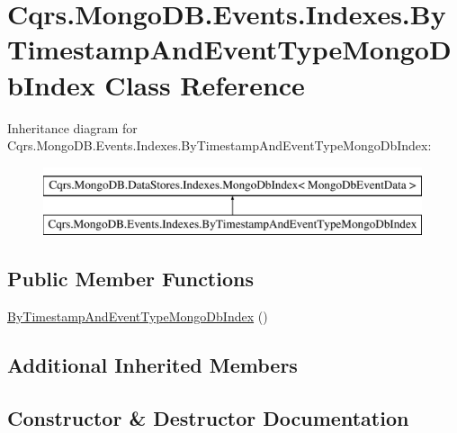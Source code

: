 \hypertarget{classCqrs_1_1MongoDB_1_1Events_1_1Indexes_1_1ByTimestampAndEventTypeMongoDbIndex}{}\section{Cqrs.\+Mongo\+D\+B.\+Events.\+Indexes.\+By\+Timestamp\+And\+Event\+Type\+Mongo\+Db\+Index Class Reference}
\label{classCqrs_1_1MongoDB_1_1Events_1_1Indexes_1_1ByTimestampAndEventTypeMongoDbIndex}
Inheritance diagram for Cqrs.\+Mongo\+D\+B.\+Events.\+Indexes.\+By\+Timestamp\+And\+Event\+Type\+Mongo\+Db\+Index\+:\begin{figure}[H]
\begin{center}
\leavevmode
\includegraphics[height=2.000000cm]{classCqrs_1_1MongoDB_1_1Events_1_1Indexes_1_1ByTimestampAndEventTypeMongoDbIndex}
\end{center}
\end{figure}
\subsection*{Public Member Functions}
\begin{DoxyCompactItemize}
\item 
\hyperlink{classCqrs_1_1MongoDB_1_1Events_1_1Indexes_1_1ByTimestampAndEventTypeMongoDbIndex_ac31e888bf88b4cabc9f7be0dd1fc3ffc}{By\+Timestamp\+And\+Event\+Type\+Mongo\+Db\+Index} ()
\end{DoxyCompactItemize}
\subsection*{Additional Inherited Members}


\subsection{Constructor \& Destructor Documentation}
\mbox{\label{classCqrs_1_1MongoDB_1_1Events_1_1Indexes_1_1ByTimestampAndEventTypeMongoDbIndex_ac31e888bf88b4cabc9f7be0dd1fc3ffc}} 
